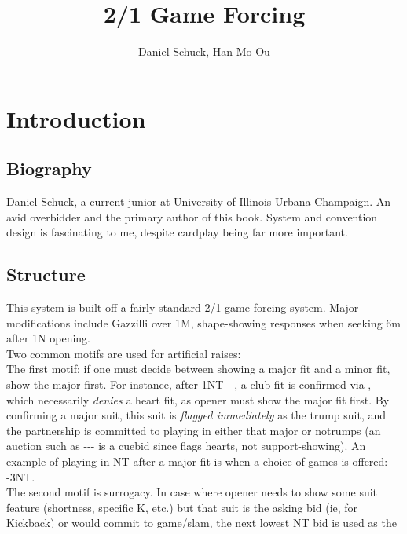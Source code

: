 \documentclass[12pt]{report}
\title{\bf{2/1 Game Forcing}}
\author{Daniel Schuck, Han-Mo Ou}
\newcommand{\n}{\\}
\begin{document}
\maketitle

\tableofcontents

\chapter{Introduction} \label{1}
\section{Biography}

    Daniel Schuck, a current junior at University of Illinois Urbana-Champaign.  An avid overbidder and the primary author of this book.  System and convention design is fascinating to me, despite cardplay being far more important.
\n

\section{Structure}

    This system is built off a fairly standard 2/1 game-forcing system.  Major modifications include Gazzilli over 1M, shape-showing responses when seeking 6m after 1N opening. \n
    
    Two common motifs are used for artificial raises: \n
    
    The first motif: if one must decide between showing a major fit and a minor fit, show the major first. For instance, after 1NT---, a club fit is confirmed via , which necessarily \textit{denies} a heart fit, as opener must show the major fit first.  By confirming a major suit, this suit is \textit{flagged immediately} as the trump suit, and the partnership is committed to playing in either that major or notrumps (an auction such as --- is a cuebid since  flags hearts, not support-showing).  An example of playing in NT after a major fit is when a choice of games is offered: ---3NT.  \n

    The second motif is surrogacy.  In case where opener needs to show some suit feature (shortness, specific K, etc.) but that suit is the asking bid (ie,  for \cl{} Kickback) or would commit to game/slam, the next lowest NT bid is used as the surrogate bid (ie, 5NT to show the K of diamonds).

\chapter{Openings and Continuations}  \label{2}
\end{document}
